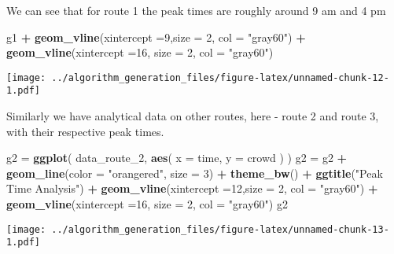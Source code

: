 \documentclass[
]{article}
\newenvironment{Shaded}{\begin{snugshade}}{\end{snugshade}}
\newcommand{\DataTypeTok}[1]{\textcolor[rgb]{0.13,0.29,0.53}{#1}}
\newcommand{\DecValTok}[1]{\textcolor[rgb]{0.00,0.00,0.81}{#1}}
\newcommand{\KeywordTok}[1]{\textcolor[rgb]{0.13,0.29,0.53}{\textbf{#1}}}
\newcommand{\NormalTok}[1]{#1}
\newcommand{\OperatorTok}[1]{\textcolor[rgb]{0.81,0.36,0.00}{\textbf{#1}}}
\newcommand{\StringTok}[1]{\textcolor[rgb]{0.31,0.60,0.02}{#1}}
\begin{document}
We can see that for route 1 the peak times are roughly around 9 am and 4
pm

\begin{Shaded}
\begin{Highlighting}[]
\NormalTok{g1 }\OperatorTok{+}\StringTok{ }\KeywordTok{geom_vline}\NormalTok{(}\DataTypeTok{xintercept =}\DecValTok{9}\NormalTok{,}\DataTypeTok{size =} \DecValTok{2}\NormalTok{, }\DataTypeTok{col =} \StringTok{"gray60"}\NormalTok{) }\OperatorTok{+}\StringTok{ }\KeywordTok{geom_vline}\NormalTok{(}\DataTypeTok{xintercept =}\DecValTok{16}\NormalTok{, }\DataTypeTok{size =} \DecValTok{2}\NormalTok{, }\DataTypeTok{col =} \StringTok{"gray60"}\NormalTok{) }
\end{Highlighting}
\end{Shaded}

\texttt{[image: ../algorithm\_generation\_files/figure-latex/unnamed-chunk-12-1.pdf]}

Similarly we have analytical data on other routes, here - route 2 and
route 3, with their respective peak times.

\begin{Shaded}
\begin{Highlighting}[]
\NormalTok{g2 =}\StringTok{ }\KeywordTok{ggplot}\NormalTok{(}
\NormalTok{  data_route_}\DecValTok{2}\NormalTok{,}
      \KeywordTok{aes}\NormalTok{(}
        \DataTypeTok{x =}\NormalTok{ time,}
        \DataTypeTok{y =}\NormalTok{ crowd}
\NormalTok{      )}
\NormalTok{) }
\NormalTok{g2 =}\StringTok{ }\NormalTok{g2 }\OperatorTok{+}\StringTok{ }\KeywordTok{geom_line}\NormalTok{(}\DataTypeTok{color =} \StringTok{"orangered"}\NormalTok{, }\DataTypeTok{size =} \DecValTok{3}\NormalTok{) }\OperatorTok{+}\StringTok{ }\KeywordTok{theme_bw}\NormalTok{() }\OperatorTok{+}\StringTok{ }\KeywordTok{ggtitle}\NormalTok{(}\StringTok{"Peak Time Analysis"}\NormalTok{) }\OperatorTok{+}\StringTok{ }\KeywordTok{geom_vline}\NormalTok{(}\DataTypeTok{xintercept =}\DecValTok{12}\NormalTok{,}\DataTypeTok{size =} \DecValTok{2}\NormalTok{, }\DataTypeTok{col =} \StringTok{"gray60"}\NormalTok{) }\OperatorTok{+}\StringTok{ }\KeywordTok{geom_vline}\NormalTok{(}\DataTypeTok{xintercept =}\DecValTok{16}\NormalTok{, }\DataTypeTok{size =} \DecValTok{2}\NormalTok{, }\DataTypeTok{col =} \StringTok{"gray60"}\NormalTok{) }
\NormalTok{g2}
\end{Highlighting}
\end{Shaded}

\texttt{[image: ../algorithm\_generation\_files/figure-latex/unnamed-chunk-13-1.pdf]}
\end{document}

